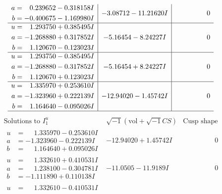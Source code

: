 \documentclass[1p]{elsarticle_modified}
\theoremstyle{definition}
\newcommand{\I}{\sqrt{-1}}
\begin{document}
$$\begin{array}{c|c|c}
\begin{aligned}
a &= \phantom{-}0.239652 - 0.318158 I \\
b &= -0.400675 - 1.169980 I\end{aligned}
 & -3.08712 - 11.21620 I & \phantom{-0.000000 } 0 \\ \hline\begin{aligned}
u &= \phantom{-}1.293750 + 0.385495 I \\
a &= -1.268880 + 0.317852 I \\
b &= \phantom{-}1.120670 - 0.123023 I\end{aligned}
 & -5.16454 - 8.24227 I & \phantom{-0.000000 } 0 \\ \hline\begin{aligned}
u &= \phantom{-}1.293750 - 0.385495 I \\
a &= -1.268880 - 0.317852 I \\
b &= \phantom{-}1.120670 + 0.123023 I\end{aligned}
 & -5.16454 + 8.24227 I & \phantom{-0.000000 } 0 \\ \hline\begin{aligned}
u &= \phantom{-}1.335970 + 0.253610 I \\
a &= -1.323960 + 0.222139 I \\
b &= \phantom{-}1.164640 - 0.095026 I\end{aligned}
 & -12.94020 - 1.45742 I & \phantom{-0.000000 } 0\\
 \hline 
 \end{array}$$\newpage$$\begin{array}{c|c|c}  
\text{Solutions to }I^u_{1}& \I (\text{vol} + \sqrt{-1}CS) & \text{Cusp shape}\\
 \hline 
\begin{aligned}
u &= \phantom{-}1.335970 - 0.253610 I \\
a &= -1.323960 - 0.222139 I \\
b &= \phantom{-}1.164640 + 0.095026 I\end{aligned}
 & -12.94020 + 1.45742 I & \phantom{-0.000000 } 0 \\ \hline\begin{aligned}
u &= \phantom{-}1.332610 + 0.410531 I \\
a &= \phantom{-}1.238100 - 0.304781 I \\
b &= -1.111890 + 0.110138 I\end{aligned}
 & -11.0505 - 11.9189 I & \phantom{-0.000000 } 0 \\ \hline\begin{aligned}
u &= \phantom{-}1.332610 - 0.410531 I \\

\end{aligned}
\end{array}$$
\end{document}
